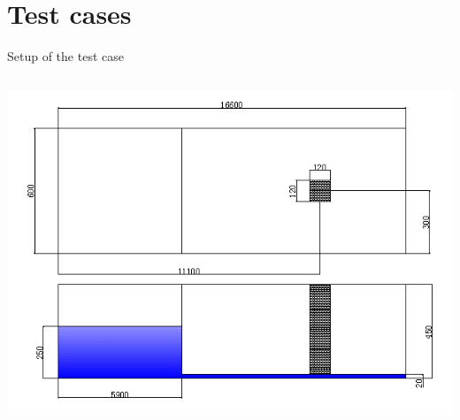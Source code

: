 \documentclass[xcolor=dvipsnames]{beamer}
\begin{document}
\section{Test cases}
\label{sec-5}
\begin{frame}[label=sec-5-1]{Setup of the test case}
\begin{columns}
\begin{column}{1.0\textwidth}
\begin{block}{}
\includegraphics[width=.9\linewidth]{../proposal/figures/Diagram_case.jpg} \\
\end{block}
\end{column}
\end{columns}
\end{frame}
\end{document}
